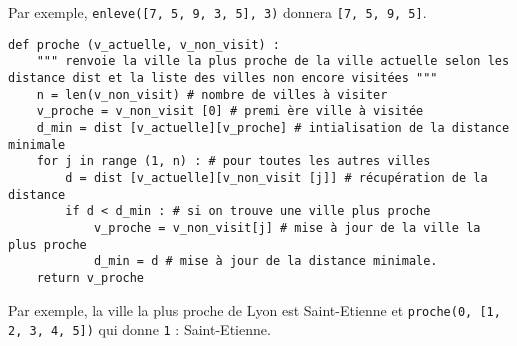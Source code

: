 \begin{exemple}
Par exemple, \lstinline{enleve([7, 5, 9, 3, 5], 3)} donnera \lstinline{[7, 5, 9, 5]}.
\end{exemple}


\ifprof
\begin{corrige}
\begin{lstlisting}
def proche (v_actuelle, v_non_visit) :
    """ renvoie la ville la plus proche de la ville actuelle selon les distance dist et la liste des villes non encore visitées """
    n = len(v_non_visit) # nombre de villes à visiter
    v_proche = v_non_visit [0] # premi ère ville à visitée
    d_min = dist [v_actuelle][v_proche] # intialisation de la distance minimale
    for j in range (1, n) : # pour toutes les autres villes
        d = dist [v_actuelle][v_non_visit [j]] # récupération de la distance
        if d < d_min : # si on trouve une ville plus proche
            v_proche = v_non_visit[j] # mise à jour de la ville la plus proche
            d_min = d # mise à jour de la distance minimale.
    return v_proche
\end{lstlisting}
\end{corrige}
\else
\fi

\begin{exemple}
Par exemple, la ville la plus proche de Lyon est Saint-Etienne et \lstinline{proche(0, [1, 2, 3, 4, 5])} qui donne \lstinline{1} : Saint-Etienne.
\end{exemple}

